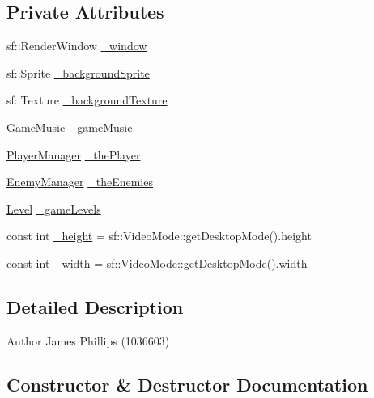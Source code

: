 \subsection*{Private Attributes}
\begin{DoxyCompactItemize}
\item 
sf\+::\+Render\+Window \hyperlink{class_engine_afd93e6a52301e792650f99043f113cbf}{\+\_\+window}
\item 
sf\+::\+Sprite \hyperlink{class_engine_a1d2219c1a87bf21a3d2bc380624aad5d}{\+\_\+background\+Sprite}
\item 
sf\+::\+Texture \hyperlink{class_engine_aeb8f54a010a6f1442872692ce869166a}{\+\_\+background\+Texture}
\item 
\hyperlink{class_game_music}{Game\+Music} \hyperlink{class_engine_a65c78abdcfa8ae0c4dbe04985b09eac7}{\+\_\+game\+Music}
\item 
\hyperlink{class_player_manager}{Player\+Manager} \hyperlink{class_engine_ad9c98c3f60277c95d34d48e02082c47c}{\+\_\+the\+Player}
\item 
\hyperlink{class_enemy_manager}{Enemy\+Manager} \hyperlink{class_engine_af5dd5d02b414b2a098988c371b00ac88}{\+\_\+the\+Enemies}
\item 
\hyperlink{class_level}{Level} \hyperlink{class_engine_aef39034128dc92b64d76435742ca6851}{\+\_\+game\+Levels}
\item 
const int \hyperlink{class_engine_a75beb6a1c14b936fa666bb2de726dc12}{\+\_\+height} = sf\+::\+Video\+Mode\+::get\+Desktop\+Mode().height
\item 
const int \hyperlink{class_engine_a535dc0c572ec7af354a4b15f20bb02df}{\+\_\+width} = sf\+::\+Video\+Mode\+::get\+Desktop\+Mode().width
\end{DoxyCompactItemize}


\subsection{Detailed Description}
\begin{DoxyAuthor}{Author}
James Phillips (1036603) 
\end{DoxyAuthor}


\subsection{Constructor \& Destructor Documentation}
\mbox{\label{class_engine_a8c98683b0a3aa28d8ab72a8bcd0d52f2}} 
